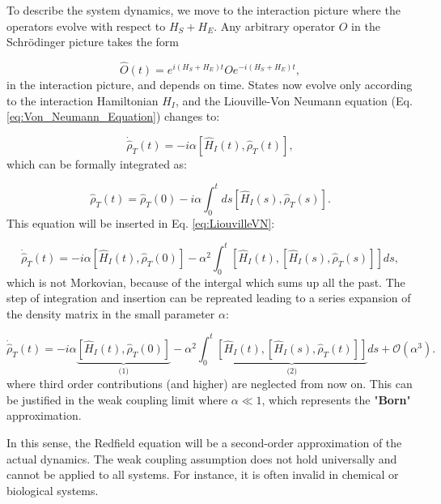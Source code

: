 To describe the system dynamics, we move to the interaction picture where the operators evolve with respect to $H_S + H_E$.
Any arbitrary operator $O$ in the Schrödinger picture takes the form

\begin{equation}
    \hat{O}(t) = e^{i(H_S+H_E)t} O e^{-i(H_S+H_E)t},
    \label{eq:Interaction_Picture_Operators}
\end{equation}
in the interaction picture, and depends on time.
States now evolve only according to the interaction Hamiltonian $H_I$, and the Liouville-Von Neumann equation (Eq. \eqref{eq:Von_Neumann_Equation}) changes to:

\begin{equation}
    \dot{\hat{\rho}}_T(t) = -i \alpha [\hat{H}_I(t), \hat{\rho}_T(t)],
    \label{eq:LiouvilleVN}
\end{equation}
which can be formally integrated as:

\begin{equation}
    \hat{\rho}_T(t) = \hat{\rho}_T(0) - i \alpha \int_0^t ds [\hat{H}_I(s), \hat{\rho}_T(s)].
    \label{eq:Formal_Integration}
\end{equation}
This equation will be inserted in Eq. \eqref{eq:LiouvilleVN}:

\begin{equation}
    \dot{\hat{\rho}}_T(t) = -i \alpha \left[ \hat{H}_I(t), \hat{\rho}_T(0) \right]
    - \alpha^2 \int_0^t \left[ \hat{H}_I(t), \left[ \hat{H}_I(s), \hat{\rho}_T(s) \right] \right] ds,
    \label{eq:Second_Order_Expansion}
\end{equation}
which is not Morkovian, because of the intergal which sums up all the past.
The step of integration and insertion can be repreated leading to a series expansion of the density matrix in the small parameter $\alpha$:

\begin{equation}
    \dot{\hat{\rho}}_T(t) = -i \alpha \underbrace{\left[ \hat{H}_I(t), \hat{\rho}_T(0) \right]}_{\text{(1)}}
    - \alpha^2 \int_0^t \underbrace{\left[ \hat{H}_I(t), \left[ \hat{H}_I(s), \hat{\rho}_T(t) \right] \right]}_{\text{(2)}} ds + \mathcal{O} (\alpha^3).
    \label{eq:Second_Order_Expansion_wo_third}
\end{equation}
where third order contributions (and higher) are neglected from now on.
This can be justified in the weak coupling limit where $ \alpha \ll 1 $, which represents the "\textbf{Born}" approximation.

In this sense, the Redfield equation will be a second-order approximation of the actual dynamics.
The weak coupling assumption does not hold universally and cannot be applied to all systems.
For instance, it is often invalid in chemical or biological systems.

